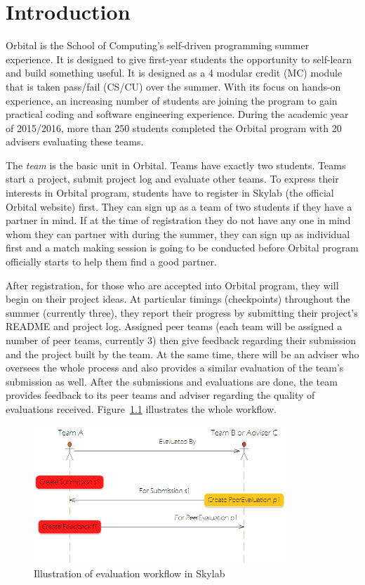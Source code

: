 \chapter{Introduction} \label{introduction}

Orbital is the School of Computing's self-driven programming summer experience. It is designed to give first-year students the opportunity to self-learn and build something useful. It is designed as a 4 modular credit (MC) module that is taken pass/fail (CS/CU) over the summer\cite{citation0}. With its focus on hands-on experience, an increasing number of students are joining the program to gain practical coding and software engineering experience. During the academic year of 2015/2016, more than 250 students completed the Orbital program with 20 advisers evaluating these teams.

The {\it team} is the basic unit in Orbital.  Teams have exactly two students.  Teams start a project, submit project log and evaluate other teams. To express their interests in Orbital program, students have to register in Skylab (the official Orbital website) first. They can sign up as a team of two students if they have a partner in mind. If at the time of registration they do not have any one in mind whom they can partner with during the summer, they can sign up as individual first and a match making session is going to be conducted before Orbital program officially starts to help them find a good partner.
  
After registration, for those who are accepted into Orbital program, they will begin on their project ideas.  At particular timings (checkpoints) throughout the summer (currently three), they report their progress by submitting their project's README and project log.  Assigned peer teams (each team will be assigned a number of peer teams, currently 3) then give feedback regarding their submission and the project built by the team. At the same time, there will be an adviser who oversees the whole process and also provides a similar evaluation of the team's submission as well. After the submissions and evaluations are done, the team provides feedback to its peer teams and adviser regarding the quality of evaluations received. Figure~\ref{fig:EvaluationWorkflow} illustrates the whole workflow.

\begin{figure}[h]
  \centering
  \includegraphics[width=0.85\textwidth]{Images/Skylab_Evaluation_Workflow.png}
  \caption{Illustration of evaluation workflow in Skylab}
  \label{fig:EvaluationWorkflow}
\end{figure}

